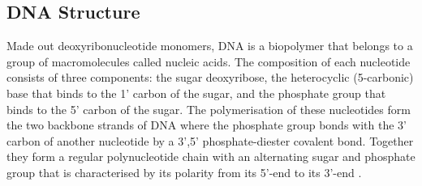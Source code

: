 
\subsection{DNA Structure}  

Made out deoxyribonucleotide monomers, DNA is a biopolymer that belongs to a group of macromolecules called nucleic acids. The composition of each nucleotide consists of three components: the sugar deoxyribose, the heterocyclic (5-carbonic) base that binds to the 1' carbon of the sugar, and the phosphate group that binds to the 5' carbon of the sugar. The polymerisation of these nucleotides form the two backbone strands of DNA where the phosphate group bonds with the 3' carbon of another nucleotide by a 3',5' phosphate-diester covalent bond. Together they form a regular polynucleotide chain with an alternating sugar and phosphate group that is characterised by its polarity from its 5'-end to its 3'-end \cite{Berg2010,Watson2003}. 

